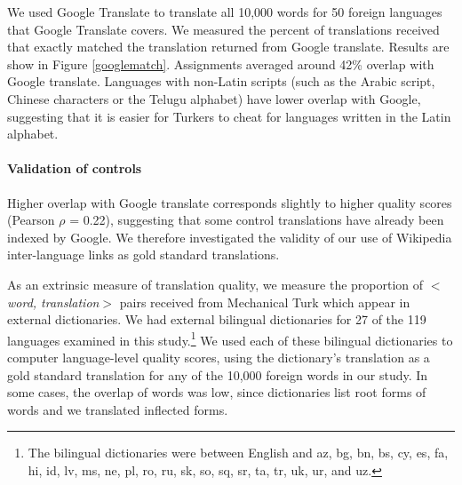 \documentclass[11pt]{article}
\begin{document}
We used Google Translate to translate all 10,000 words for 50 foreign languages that Google Translate covers. We measured the percent of translations received that exactly matched the translation returned from Google translate. Results are show in Figure \ref{googlematch}. 
Assignments averaged around 42\% overlap with Google translate.  Languages with non-Latin scripts (such as the Arabic script, Chinese characters or the Telugu alphabet) have lower overlap with Google,  suggesting that it is easier for Turkers to cheat for languages written in the Latin alphabet. 





\paragraph{Validation of controls} 
Higher overlap with Google translate corresponds slightly to higher quality scores (Pearson $\rho$ = 0.22), suggesting that some control translations have already been indexed by Google. We therefore investigated the validity of our use of Wikipedia inter-language links as gold standard translations.

As an extrinsic measure of translation quality, we measure the proportion of $<${\it word, translation}$>$ pairs received from Mechanical Turk which appear in external dictionaries.  We had external bilingual dictionaries for 27 of the 119 languages examined in this study.\footnote{The bilingual dictionaries were between English and az, bg, bn, bs, cy, es, fa, hi, id, lv, ms, ne, pl, ro, ru, sk, so, sq, sr, ta, tr, uk, ur, and uz. }  We used each of these bilingual dictionaries to computer language-level quality scores, using the dictionary's translation as a gold standard translation for any of the 10,000 foreign words in our study.  In some cases, the overlap of words was low, since dictionaries list root forms of words and we translated inflected forms.  
\end{document}

